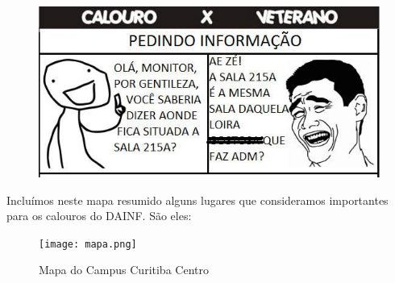 \documentclass[a4paper,12pt,openany]{article}
\begin{document}
\begin{figure}[ht!]  \centering
		\includegraphics[scale=0.5]{calouro1.jpg}
		\label{fig01}
	\end{figure}

Incluímos neste mapa resumido alguns lugares que consideramos importantes para os calouros do DAINF. São eles:

	\begin{figure}[ht!]  \centering
		\texttt{[image: mapa.png]}
		\caption{Mapa do Campus Curitiba Centro}
		\label{fig01}
	\end{figure}
\end{document}
